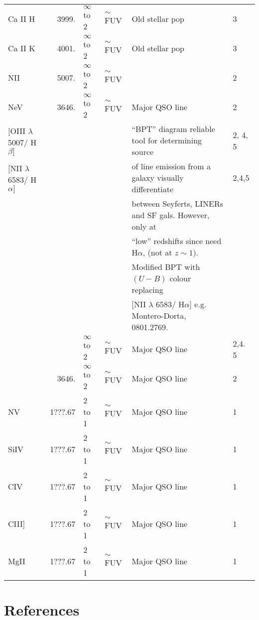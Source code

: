 \documentclass[11pt]{article}
\begin{document}
\begin{table}
\begin{center}
\begin{tabular}{lrllll}
      \hline
      Ca II H          & 3999.   & $\infty$ to 2 & $\sim$FUV & Old stellar pop & 3 \\
      Ca II K          & 4001.   & $\infty$ to 2 & $\sim$FUV & Old stellar pop & 3 \\
      \hline
      NII              & 5007.   & $\infty$ to 2 & $\sim$FUV &  & 2 \\
      \hline
      NeV              & 3646.   & $\infty$ to 2 & $\sim$FUV & Major QSO line & 2 \\
      \hline
      $[$OIII $\lambda$ 5007/ H$\beta]$ &   &  &   & ``BPT'' diagram reliable tool for determining source & 2, 4, 5 \\
      $[$NII $\lambda$ 6583/ H$\alpha]$ & & & & of line emission from a galaxy visually differentiate & 2,4,5 \\
                                      & & & & between Seyferts, LINERs and SF gals. However, only at & \\
                                      & & & & ``low'' redshifts since need H$\alpha$, (not at $z\sim1$). & \\
                                      & & & &  Modified BPT with $(U-B)$ colour replacing & \\
                                      & & & & $[$NII $\lambda$ 6583/ H$\alpha]$ e.g. Montero-Dorta, 0801.2769. & \\
      \hline
      [SII $\lambda$ 6583/ H$\alpha$]   &    & $\infty$ to 2 & $\sim$FUV & Major QSO line & 2,4. 5  \\
      \hline
      [$\alpha$/Fe]             & 3646.   & $\infty$ to 2 & $\sim$FUV & Major QSO line & 2 \\
      \hline
      NV               & 1???.67 & 2 to 1        & $\sim$FUV & Major QSO line       & 1 \\
      SiIV             & 1???.67 & 2 to 1        & $\sim$FUV & Major QSO line       & 1 \\
      CIV              & 1???.67 & 2 to 1        & $\sim$FUV & Major QSO line       & 1 \\
      CIII]            & 1???.67 & 2 to 1        & $\sim$FUV & Major QSO line       & 1 \\
      MgII             & 1???.67 & 2 to 1        & $\sim$FUV & Major QSO line       & 1 \\
      \hline
      \hline
    \end{tabular}
  \end{center}
\end{table}




\section{References}
\citet{Ross07}



\end{document}
